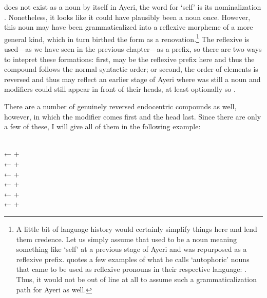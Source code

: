  does not exist as a noun by itself in Ayeri, the word for 
`self' is its nominalization . Nonetheless, it looks 
like it could have plausibly been a noun once. However, this noun 
may have been grammaticalized into a reflexive morpheme of a more 
general kind, which in turn birthed the form  as a 
renovation.\footnote{A little bit of language history would certainly simplify 
things here and lend them credence. Let us simply assume that 
 used to be a noun meaning something like `self' at a 
previous stage of Ayeri and was repurposed as a reflexive prefix. 
\citet{lehmann2015} quotes a few examples of what he calls `autophoric' nouns 
that came to be used as reflexive pronouns in their respective language: 
. Thus, it would not be out of
line at all to assume such a grammaticalization path for Ayeri as well.} The
reflexive  is used---as we have seen in the previous
chapter---as a prefix, so there are two ways to intepret these formations:
first,  may be the reflexive prefix here and thus the
compound follows the normal syntactic order; or second, the order of elements
is reversed and thus may reflect an earlier stage of Ayeri where
 was still a noun and modifiers could still appear in front
of their heads, at least optionally so \citep[133--137]{gaeta2008}.

There are a number of genuinely reversed endocentric compounds as well, 
however, in which the modifier comes first and the head last. Since there are 
only a few of these, I will give all of them in the following example:

\pex
	\a {} \\
		← 
		+ 
	\a {} \\
		← 
		+ 
	\a {} \\
		← 
		+ 
	\a {} \\
		← 
		+ 
	\a {} \\
		← 
		+ 
	\a {} \\
		← 
		+ \ques{}\,
\xe

